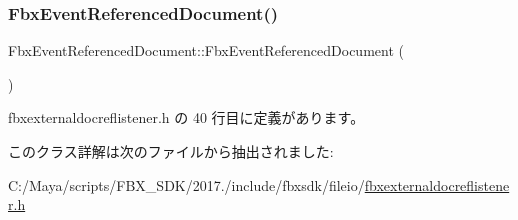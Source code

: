\subsubsection{\texorpdfstring{Fbx\+Event\+Referenced\+Document()}{FbxEventReferencedDocument()}}
{\footnotesize\ttfamily Fbx\+Event\+Referenced\+Document\+::\+Fbx\+Event\+Referenced\+Document (\begin{DoxyParamCaption}{ }\end{DoxyParamCaption})\hspace{0.3cm}{\ttfamily [inline]}}



 fbxexternaldocreflistener.\+h の 40 行目に定義があります。



このクラス詳解は次のファイルから抽出されました\+:\begin{DoxyCompactItemize}
\item 
C\+:/\+Maya/scripts/\+F\+B\+X\+\_\+\+S\+D\+K/2017./include/fbxsdk/fileio/\hyperlink{fbxexternaldocreflistener_8h}{fbxexternaldocreflistener.\+h}\end{DoxyCompactItemize}
